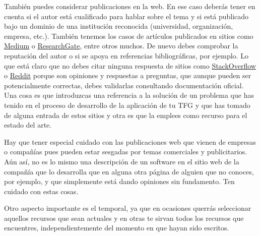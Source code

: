
También puedes considerar publicaciones en la web. En ese caso deberás tener en cuenta si el autor está cualificado para hablar sobre el tema y si está publicado bajo un dominio de una institución reconocida (universidad, organización, empresa, etc.). También tenemos los casos de artículos publicados en sitios como \href{www.medium.com}{Medium} o \href{www.researchgate.net}{ResearchGate}, entre otros muchos. De nuevo debes comprobar la reputación del autor o si se apoya en referencias bibliográficas, por ejemplo. Lo que está claro que no debes citar ninguna respuesta de sitios como \href{https://stackoverflow.com/}{StackOverflow} o \href{https://www.reddit.com}{Reddit} porque son opiniones y respuestas a preguntas, que aunque pueden ser potencialmente correctas, debes validarlas consultando documentación oficial. Una cosa es que introduzcas una referencia a la solución de un problema que has tenido en el proceso de desarrollo de la aplicación de tu TFG y que has tomado de alguna entrada de estos sitios y otra es que la emplees como recurso para el estado del arte.

Hay que tener especial cuidado con las publicaciones web que vienen de empresas o compañías pues pueden estar sesgadas por temas comerciales y publicitarios. Aún así, no es lo mismo una descripción de un software en el sitio web de la compañía que lo desarrolla que en alguna otra página de alguien que no conoces, por ejemplo, y que simplemente está dando opiniones sin fundamento. Ten cuidado con estas cosas.  

Otro aspecto importante es el temporal, ya que en ocasiones querrás seleccionar aquellos recursos que sean actuales y en otras te sirvan todos los recursos que encuentres, independientemente del momento en que hayan sido escritos. 

